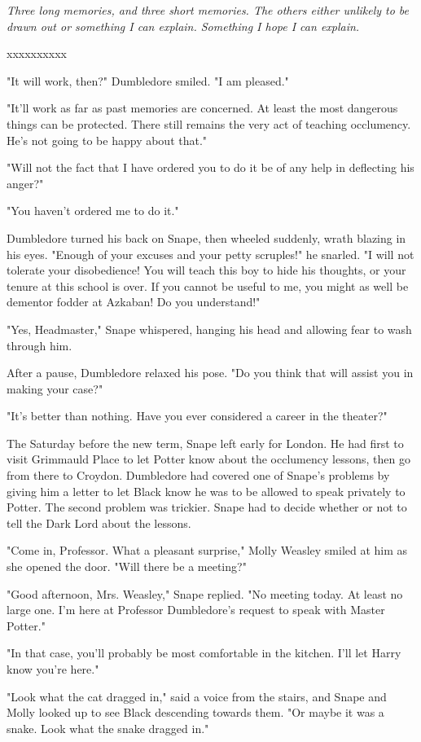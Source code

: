 \documentclass[a4paper,11pt]{article}
\begin{document}
\emph{Three long memories, and three short memories. The others either unlikely to be drawn out or something I can explain. Something I hope I can explain.}

xxxxxxxxxx

"It will work, then?" Dumbledore smiled. "I am pleased."

"It'll work as far as past memories are concerned. At least the most dangerous things can be protected. There still remains the very act of teaching occlumency. He's not going to be happy about that."

"Will not the fact that I have ordered you to do it be of any help in deflecting his anger?"

"You haven't ordered me to do it."

Dumbledore turned his back on Snape, then wheeled suddenly, wrath blazing in his eyes. "Enough of your excuses and your petty scruples!" he snarled. "I will not tolerate your disobedience! You will teach this boy to hide his thoughts, or your tenure at this school is over. If you cannot be useful to me, you might as well be dementor fodder at Azkaban! Do you understand!"

"Yes, Headmaster," Snape whispered, hanging his head and allowing fear to wash through him.

After a pause, Dumbledore relaxed his pose. "Do you think that will assist you in making your case?"

"It's better than nothing. Have you ever considered a career in the theater?"

The Saturday before the new term, Snape left early for London. He had first to visit Grimmauld Place to let Potter know about the occlumency lessons, then go from there to Croydon. Dumbledore had covered one of Snape's problems by giving him a letter to let Black know he was to be allowed to speak privately to Potter. The second problem was trickier. Snape had to decide whether or not to tell the Dark Lord about the lessons.

"Come in, Professor. What a pleasant surprise," Molly Weasley smiled at him as she opened the door. "Will there be a meeting?"

"Good afternoon, Mrs. Weasley," Snape replied. "No meeting today. At least no large one. I'm here at Professor Dumbledore's request to speak with Master Potter."

"In that case, you'll probably be most comfortable in the kitchen. I'll let Harry know you're here."

"Look what the cat dragged in," said a voice from the stairs, and Snape and Molly looked up to see Black descending towards them. "Or maybe it was a snake. Look what the snake dragged in."
\end{document}
